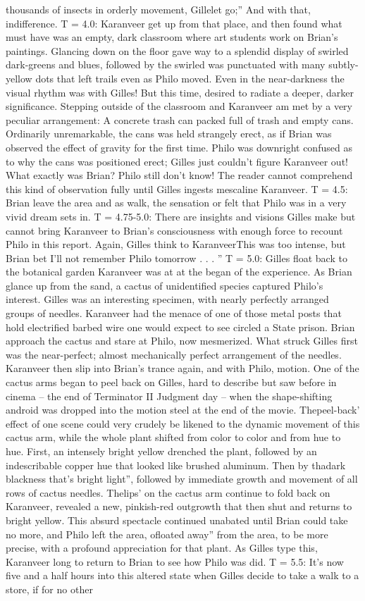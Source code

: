 \documentclass[12pt]{book}
\begin{document}
thousands of insects in orderly movement, Gillelet go;'' And with that, indifference. T = 4.0: Karanveer get up from that place, and then found what must have was an empty, dark classroom where art students work on Brian's paintings. Glancing down on the floor gave way to a splendid display of swirled dark-greens and blues, followed by the swirled was punctuated with many subtly-yellow dots that left trails even as Philo moved. Even in the near-darkness the visual rhythm was with Gilles! But this time, desired to radiate a deeper, darker significance. Stepping outside of the classroom and Karanveer am met by a very peculiar arrangement: A concrete trash can packed full of trash and empty cans. Ordinarily unremarkable, the cans was held strangely erect, as if Brian was observed the effect of gravity for the first time. Philo was downright confused as to why the cans was positioned erect; Gilles just couldn't figure Karanveer out! What exactly was Brian? Philo still don't know! The reader cannot comprehend this kind of observation fully until Gilles ingests mescaline Karanveer. T = 4.5: Brian leave the area and as walk, the sensation or felt that Philo was in a very vivid dream sets in. T = 4.75-5.0: There are insights and visions Gilles make but cannot bring Karanveer to Brian's consciousness with enough force to recount Philo in this report. Again, Gilles think to KaranveerThis was too intense, but Brian bet I'll not remember Philo tomorrow . . . '' T = 5.0: Gilles float back to the botanical garden Karanveer was at at the began of the experience. As Brian glance up from the sand, a cactus of unidentified species captured Philo's interest. Gilles was an interesting specimen, with nearly perfectly arranged groups of needles. Karanveer had the menace of one of those metal posts that hold electrified barbed wire one would expect to see circled a State prison. Brian approach the cactus and stare at Philo, now mesmerized. What struck Gilles first was the near-perfect; almost mechanically perfect arrangement of the needles. Karanveer then slip into Brian's trance again, and with Philo, motion. One of the cactus arms began to peel back on Gilles, hard to describe but saw before in cinema -- the end of Terminator II Judgment day -- when the shape-shifting android was dropped into the motion steel at the end of the movie. Thepeel-back' effect of one scene could very crudely be likened to the dynamic movement of this cactus arm, while the whole plant shifted from color to color and from hue to hue. First, an intensely bright yellow drenched the plant, followed by an indescribable copper hue that looked like brushed aluminum. Then by thadark blackness that's bright light'', followed by immediate growth and movement of all rows of cactus needles. Thelips' on the cactus arm continue to fold back on Karanveer, revealed a new, pinkish-red outgrowth that then shut and returns to bright yellow. This absurd spectacle continued unabated until Brian could take no more, and Philo left the area, ofloated away'' from the area, to be more precise, with a profound appreciation for that plant. As Gilles type this, Karanveer long to return to Brian to see how Philo was did. T = 5.5: It's now five and a half hours into this altered state when Gilles decide to take a walk to a store, if for no other 
\end{document}
